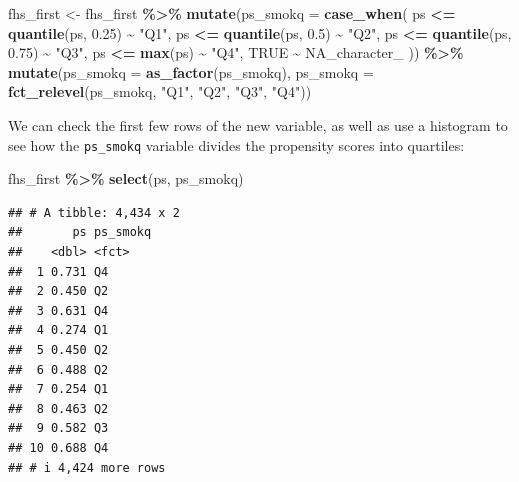 \documentclass[
]{book}
\newenvironment{Shaded}{\begin{snugshade}}{\end{snugshade}}
\newcommand{\AttributeTok}[1]{\textcolor[rgb]{0.13,0.29,0.53}{#1}}
\newcommand{\ConstantTok}[1]{\textcolor[rgb]{0.56,0.35,0.01}{#1}}
\newcommand{\FloatTok}[1]{\textcolor[rgb]{0.00,0.00,0.81}{#1}}
\newcommand{\FunctionTok}[1]{\textcolor[rgb]{0.13,0.29,0.53}{\textbf{#1}}}
\newcommand{\NormalTok}[1]{#1}
\newcommand{\OtherTok}[1]{\textcolor[rgb]{0.56,0.35,0.01}{#1}}
\newcommand{\SpecialCharTok}[1]{\textcolor[rgb]{0.81,0.36,0.00}{\textbf{#1}}}
\newcommand{\StringTok}[1]{\textcolor[rgb]{0.31,0.60,0.02}{#1}}
\begin{document}
\begin{Shaded}
\begin{Highlighting}[]
\NormalTok{fhs\_first }\OtherTok{\textless{}{-}}\NormalTok{ fhs\_first }\SpecialCharTok{\%\textgreater{}\%}
  \FunctionTok{mutate}\NormalTok{(}\AttributeTok{ps\_smokq =} \FunctionTok{case\_when}\NormalTok{(}
\NormalTok{    ps }\SpecialCharTok{\textless{}=} \FunctionTok{quantile}\NormalTok{(ps, }\FloatTok{0.25}\NormalTok{) }\SpecialCharTok{\textasciitilde{}} \StringTok{"Q1"}\NormalTok{, }
\NormalTok{    ps }\SpecialCharTok{\textless{}=} \FunctionTok{quantile}\NormalTok{(ps, }\FloatTok{0.5}\NormalTok{)  }\SpecialCharTok{\textasciitilde{}} \StringTok{"Q2"}\NormalTok{, }
\NormalTok{    ps }\SpecialCharTok{\textless{}=} \FunctionTok{quantile}\NormalTok{(ps, }\FloatTok{0.75}\NormalTok{) }\SpecialCharTok{\textasciitilde{}} \StringTok{"Q3"}\NormalTok{, }
\NormalTok{    ps }\SpecialCharTok{\textless{}=} \FunctionTok{max}\NormalTok{(ps)            }\SpecialCharTok{\textasciitilde{}} \StringTok{"Q4"}\NormalTok{, }
    \ConstantTok{TRUE} \SpecialCharTok{\textasciitilde{}} \ConstantTok{NA\_character\_}
\NormalTok{  )) }\SpecialCharTok{\%\textgreater{}\%} 
  \FunctionTok{mutate}\NormalTok{(}\AttributeTok{ps\_smokq =} \FunctionTok{as\_factor}\NormalTok{(ps\_smokq), }
         \AttributeTok{ps\_smokq =} \FunctionTok{fct\_relevel}\NormalTok{(ps\_smokq, }\StringTok{"Q1"}\NormalTok{, }\StringTok{"Q2"}\NormalTok{, }\StringTok{"Q3"}\NormalTok{, }\StringTok{"Q4"}\NormalTok{))}
\end{Highlighting}
\end{Shaded}

We can check the first few rows of the new variable, as well as use a histogram to see how the \texttt{ps\_smokq} variable divides the propensity scores into quartiles:

\begin{Shaded}
\begin{Highlighting}[]
\NormalTok{fhs\_first }\SpecialCharTok{\%\textgreater{}\%} 
  \FunctionTok{select}\NormalTok{(ps, ps\_smokq)}
\end{Highlighting}
\end{Shaded}

\begin{verbatim}
## # A tibble: 4,434 x 2
##       ps ps_smokq
##    <dbl> <fct>   
##  1 0.731 Q4      
##  2 0.450 Q2      
##  3 0.631 Q4      
##  4 0.274 Q1      
##  5 0.450 Q2      
##  6 0.488 Q2      
##  7 0.254 Q1      
##  8 0.463 Q2      
##  9 0.582 Q3      
## 10 0.688 Q4      
## # i 4,424 more rows
\end{verbatim}
\end{document}
